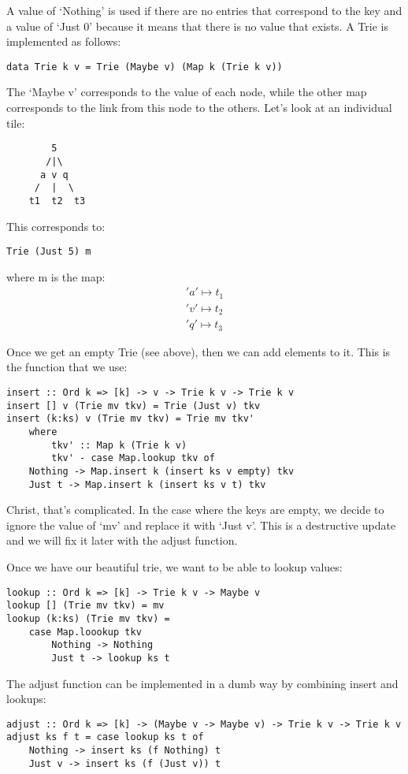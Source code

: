\documentclass[11pt,a4paper,titlepage]{scrartcl}
\begin{document}
A value of `Nothing' is used if there are no entries that correspond to
the key and a value of `Just 0' because it means that there is no value
that exists. A Trie is implemented as follows:
\begin{lstlisting}
data Trie k v = Trie (Maybe v) (Map k (Trie k v))
\end{lstlisting}

The `Maybe v' corresponds to the value of each node, while the other map
corresponds to the link from this node to the others. Let's look at an
individual tile:
\begin{lstlisting}
        5
       /|\
      a v q
     /  |  \
    t1  t2  t3
\end{lstlisting}
This corresponds to:
\begin{lstlisting}
Trie (Just 5) m
\end{lstlisting}
where m is the map:
\begin{gather*}
    'a' \mapsto t_1 \\
    'v' \mapsto t_2 \\
    'q' \mapsto t_3
\end{gather*}

Once we get an empty Trie (see above), then we can add elements to it.
This is the function that we use:
\begin{lstlisting}
insert :: Ord k => [k] -> v -> Trie k v -> Trie k v
insert [] v (Trie mv tkv) = Trie (Just v) tkv
insert (k:ks) v (Trie mv tkv) = Trie mv tkv'
    where
        tkv' :: Map k (Trie k v)
        tkv' - case Map.lookup tkv of
    Nothing -> Map.insert k (insert ks v empty) tkv
    Just t -> Map.insert k (insert ks v t) tkv
\end{lstlisting}

Christ, that's complicated. In the case where the keys are empty, we
decide to ignore the value of `mv' and replace it with `Just v'. This is a
destructive update and we will fix it later with the adjust function.

Once we have our beautiful trie, we want to be able to lookup values:
\begin{lstlisting}
lookup :: Ord k => [k] -> Trie k v -> Maybe v
lookup [] (Trie mv tkv) = mv
lookup (k:ks) (Trie mv tkv) =
    case Map.loookup tkv
        Nothing -> Nothing
        Just t -> lookup ks t
\end{lstlisting}


The adjust function can be implemented in a dumb way by combining insert
and lookups:
\begin{lstlisting}
adjust :: Ord k => [k] -> (Maybe v -> Maybe v) -> Trie k v -> Trie k v
adjust ks f t = case lookup ks t of
    Nothing -> insert ks (f Nothing) t
    Just v -> insert ks (f (Just v)) t
\end{lstlisting}
\end{document}
